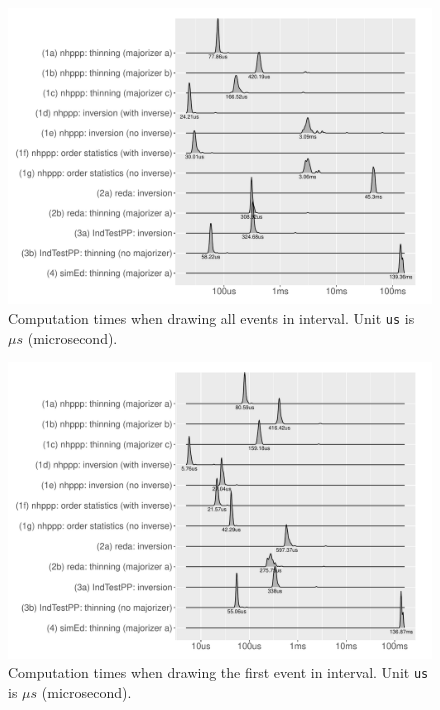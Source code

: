 \documentclass[article]{jss}\usepackage[]{graphicx}\usepackage[]{xcolor}
\makeatletter
\def\maxwidth{ %
  \ifdim\Gin@nat@width>\linewidth
    \linewidth
  \else
    \Gin@nat@width
  \fi
}
\makeatother
\begin{document}
\begin{Schunk}
\begin{figure}
\includegraphics[width=\maxwidth]{figure/comptimes_all_samples-1} \caption[Computation times when drawing all events in interval]{Computation times when drawing all events in interval. Unit \texttt{us} is $\mu s$ (microsecond).}\label{fig:comptimes_all_samples}
\end{figure}
\end{Schunk}


\begin{Schunk}
\begin{figure}
\includegraphics[width=\maxwidth]{figure/comptimes_one_sample-1} \caption[Computation times when drawing the first event in interval]{Computation times when drawing the first event in interval. Unit \texttt{us} is $\mu s$ (microsecond).}\label{fig:comptimes_one_sample}
\end{figure}
\end{Schunk}
\end{document}
